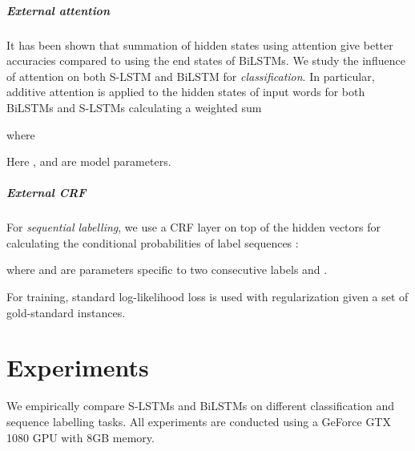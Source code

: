\documentclass[11pt,a4paper]{article}
\begin{document}
\subparagraph{External attention}
It has been shown that summation of hidden states using attention \cite{bahdanau2014neural,yang2016hierarchical} give better accuracies compared to using the end states of BiLSTMs. 
We study the influence of attention on both S-LSTM and BiLSTM for \emph{classification}. 
In particular, additive attention \cite{bahdanau2014neural} is applied to the hidden states of input words for both BiLSTMs and S-LSTMs calculating a weighted sum

where


Here ,  and  are model parameters.


\subparagraph{External CRF}
For \emph{sequential labelling}, we use a CRF layer on top of the hidden vectors  for calculating the conditional probabilities of label sequences \cite{huang2015bidirectional,ma2016end}:
 

where  and  are parameters specific to two consecutive labels  and . 


For training, standard log-likelihood loss is used with  regularization given a set of gold-standard instances. 


\section{Experiments}
We empirically compare S-LSTMs and BiLSTMs on different classification and sequence labelling tasks. 
All experiments are conducted using a GeForce GTX 1080 GPU with 8GB memory. 
\end{document}
